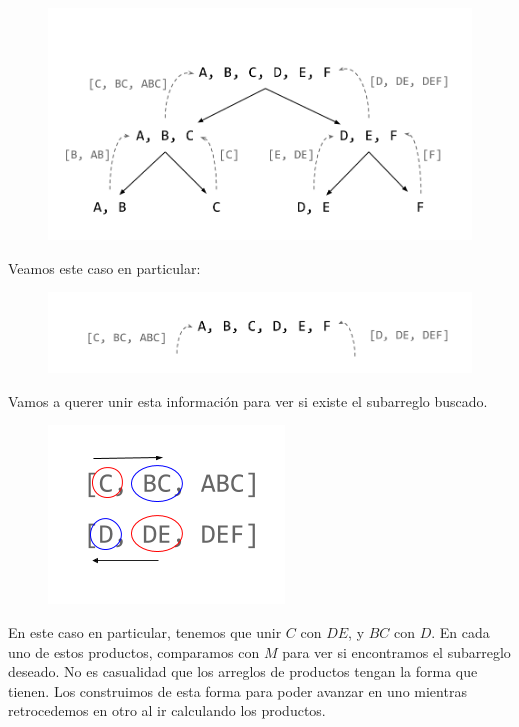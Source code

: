 \begin{figure}[H]
\centering
\includegraphics[scale=0.35]{Imagenes/ej4-ejem3}
\end{figure}

Veamos este caso en particular:

\begin{figure}[H]
\centering
\includegraphics[scale=0.35]{Imagenes/ej4-ejem4}
\end{figure}

Vamos a querer unir esta información para ver si existe el subarreglo buscado.

\begin{figure}[H]
\centering
\includegraphics[scale=0.7]{Imagenes/ej4-ejem5}
\end{figure}

En este caso en particular, tenemos que unir $C$ con $DE$, y $BC$ con $D$. En cada uno de estos productos, comparamos con $M$ para ver si encontramos el subarreglo deseado. No es casualidad que los arreglos de productos tengan la forma que tienen. Los construimos de esta forma para poder avanzar en uno mientras retrocedemos en otro al ir calculando los productos. 

